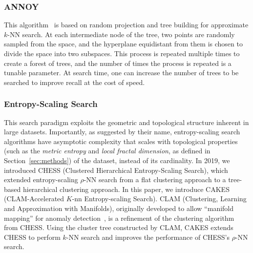 \subsubsection{ANNOY}
\label{sec:introduction:related-works:annoy}

This algorithm~\cite{annoy} is based on random projection and tree building for approximate $k$-NN search.
At each intermediate node of the tree, two points are randomly sampled from the space, and the hyperplane equidistant from them is chosen to divide the space into two subspaces.
This process is repeated multiple times to create a forest of trees, and the number of times the process is repeated is a tunable parameter.
At search time, one can increase the number of trees to be searched to improve recall at the cost of speed.

\subsubsection{Entropy-Scaling Search}
\label{sec:introduction:related-works:entropy-scaling-search}

This search paradigm exploits the geometric and topological structure inherent in large datasets.
Importantly, as suggested by their name, entropy-scaling search algorithms have asymptotic complexity that scales with topological properties (such as the \emph{metric entropy} and \emph{local fractal dimension}, as defined in Section~\ref{sec:methods}) of the dataset, instead of its cardinality.
In 2019, we introduced CHESS (Clustered Hierarchical Entropy-Scaling Search), which extended entropy-scaling $\rho$-NN search from a flat clustering approach to a tree-based hierarchical clustering approach.
In this paper, we introduce CAKES (CLAM-Accelerated $K$-nn Entropy-scaling Search).
CLAM (Clustering, Learning and Approximation with Manifolds), originally developed to allow ``manifold mapping'' for anomaly detection~\cite{ishaq2021clustered}, is a refinement of the clustering algorithm from CHESS.
Using the cluster tree constructed by CLAM, CAKES extends CHESS to perform $k$-NN search and improves the performance of CHESS's $\rho$-NN search.
